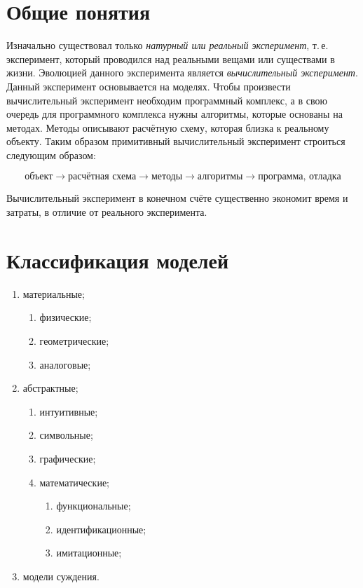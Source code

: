 
\section{Общие понятия}

Изначально существовал только \textit{натурный или реальный эксперимент}, т.\,е. эксперимент, который проводился над реальными вещами или существами в жизни. Эволюцией данного эксперимента является \textit{вычислительный эксперимент}. Данный эксперимент основывается на моделях. Чтобы произвести вычислительный эксперимент необходим программный комплекс, а в свою очередь для программного комплекса нужны алгоритмы, которые основаны на методах. Методы описывают расчётную схему, которая близка к реальному объекту. Таким образом примитивный вычислительный эксперимент строиться следующим образом:

\[
	\text{объект} \to \text{расчётная схема} \to \text{методы} \to \text{алгоритмы} \to \text{программа, отладка}
\]

Вычислительный эксперимент в конечном счёте существенно экономит время и затраты, в отличие от реального эксперимента.

\section{Классификация моделей}

\begin{enumerate}
	\item материальные;
	\begin{enumerate}
		\item физические;
		\item геометрические;
		\item аналоговые;
	\end{enumerate}
	\item абстрактные;
	\begin{enumerate}
		\item интуитивные;
		\item символьные;
		\item графические;
		\item математические;
		\begin{enumerate}
			\item функциональные;
			\item идентификационные;
			\item имитационные;
		\end{enumerate}
	\end{enumerate}
	\item модели суждения.
\end{enumerate}




